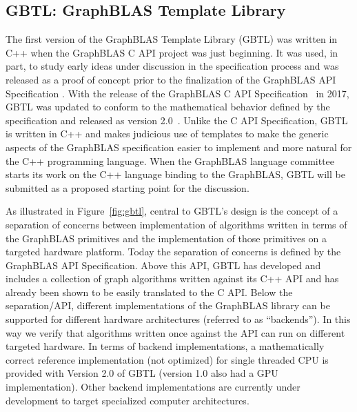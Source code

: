 \subsection{GBTL: GraphBLAS Template Library}
 
The first version of the GraphBLAS Template Library (GBTL) was written in C++ 
when the GraphBLAS C API project was just beginning.  It was used, in part, 
to study early ideas under discussion in the specification process and was released as a proof of concept 
prior to the finalization of the GraphBLAS API Specification \cite{gbtl-cuda16, McMillan2016}. With the 
release of the GraphBLAS C API Specification~\cite{cspec} in 2017, GBTL was updated to conform to 
the mathematical behavior defined by the specification and released as version 2.0~\cite{gbtl-github}.  
Unlike the C API Specification, GBTL is written in C++ and makes judicious use of templates to 
make the generic aspects of the GraphBLAS specification easier to implement and 
more natural for the C++ programming language. When the GraphBLAS language committee
starts its work on the C++ language binding to the GraphBLAS, GBTL will be submitted as a 
proposed starting point for the discussion.

 
As illustrated in Figure~\ref{fig:gbtl}, central to GBTL's design is the concept of a separation 
of concerns between implementation of algorithms written in terms of the GraphBLAS primitives 
and the implementation of those primitives on a targeted hardware platform.   Today the
 separation of concerns is defined by the GraphBLAS API Specification.  Above 
 this API, GBTL has developed and includes a collection of graph algorithms 
 written against its C++ API and has already been shown to be easily translated to the C API.  
 Below the separation/API, different implementations of the GraphBLAS library can be supported 
 for different hardware architectures (referred to as ``backends'').  In this way we verify that algorithms 
 written once against the API can run on different targeted hardware.  In terms of backend 
 implementations, a mathematically correct reference implementation (not optimized) for single 
 threaded CPU is provided with Version 2.0 of GBTL (version 1.0 also had a GPU implementation).  
 Other backend implementations are currently under development to target specialized computer architectures.

